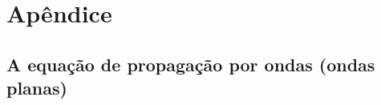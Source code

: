 \documentclass[a4paper,12pt]{article}
\begin{document}



\newpage
\section*{\sf Apêndice}
\subsection{\sf A equação de propagação por ondas (ondas planas)} 
\end{document}
